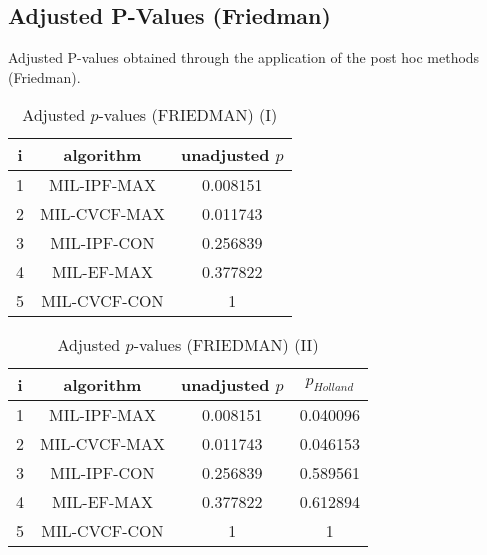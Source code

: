 \documentclass[a4paper,10pt]{article}
\begin{document}
\begin{landscape}
\newpage

\section{Adjusted P-Values (Friedman)}


Adjusted P-values obtained through the application of the post hoc methods (Friedman).

\begin{table}[!htp]
\centering\small
\begin{tabular}{ccc}
i&algorithm&unadjusted $p$\\
\hline1&MIL-IPF-MAX&0.008151\\2&MIL-CVCF-MAX&0.011743\\3&MIL-IPF-CON&0.256839\\4&MIL-EF-MAX&0.377822\\5&MIL-CVCF-CON&1\\\hline
\end{tabular}
\caption{Adjusted $p$-values (FRIEDMAN) (I)}
\end{table}
\begin{table}[!htp]
\centering\small
\begin{tabular}{cccc}
i&algorithm&unadjusted $p$&$p_{Holland}$\\
\hline1&MIL-IPF-MAX&0.008151&0.040096\\2&MIL-CVCF-MAX&0.011743&0.046153\\3&MIL-IPF-CON&0.256839&0.589561\\4&MIL-EF-MAX&0.377822&0.612894\\5&MIL-CVCF-CON&1&1\\\hline
\end{tabular}
\caption{Adjusted $p$-values (FRIEDMAN) (II)}
\end{table}

\newpage
\end{landscape}
\end{document}
